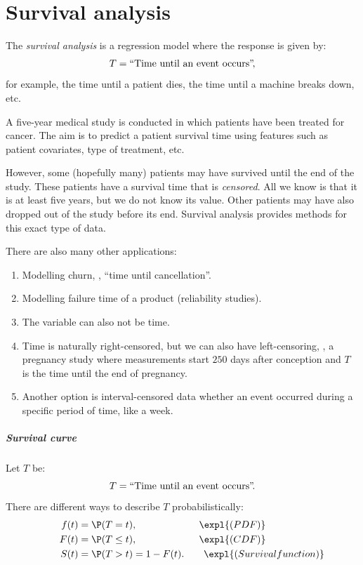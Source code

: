 \chapter{Survival analysis}

The \emph{survival analysis} is a regression model where the response is given by:
\begin{equation}
    T = \text{``Time until an event occurs''}\negthinspace,
\end{equation}
for example, the time until a patient dies, the time until a machine breaks down, etc.

\begin{example}
    A five-year medical study is conducted in which patients have been treated for cancer. The aim is to predict a patient survival time using features such as patient covariates, type of treatment, etc.

    However, some (hopefully many) patients may have survived until the end of the study. These patients have a survival time that is \emph{censored}. All we know is that it is at least five years, but we do not know its value. Other patients may have also dropped out of the study before its end. Survival analysis provides methods for this exact type of data.
\end{example}

There are also many other applications:
\begin{enumerate}
    \item Modelling churn, \ie, ``time until cancellation''\negthinspace.
    \item Modelling failure time of a product (reliability studies).
    \item The variable can also not be time.
    \item Time is naturally right-censored, but we can also have left-censoring, \eg, a pregnancy study where measurements start $250$ days after conception and $T$ is the time until the end of pregnancy.
    \item Another option is interval-censored data whether an event occurred during a specific period of time, like a week.
\end{enumerate}

\paragraph{Survival curve}

Let $T$ be:
\begin{equation}
    T = \text{``Time until an event occurs''}\negthinspace.
\end{equation}
There are different ways to describe $T$ probabilistically:
\begin{equation}
    \begin{aligned}
        \qquad f(t) &= \P(T = t),\qquad\qquad\qquad\,\,\expl{(PDF)}\\
        \qquad F(t) &= \P(T \leq t),\qquad\qquad\qquad\,\,\expl{(CDF)}\\
        \qquad S(t) &= \P(T > t) = 1 - F(t).\qquad\expl{(Survival function)}
    \end{aligned}
\end{equation}

